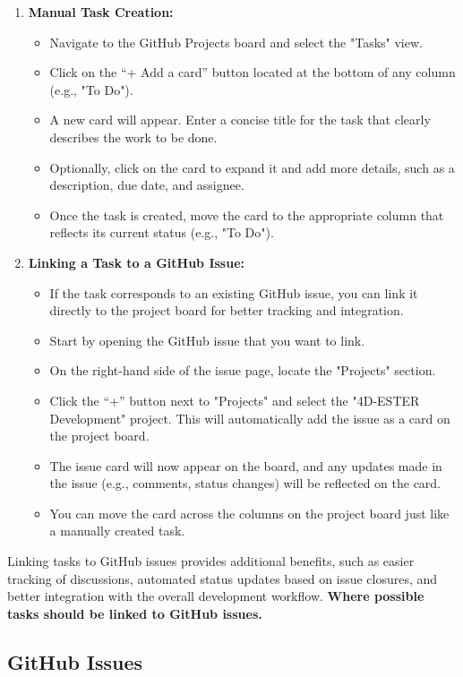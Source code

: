 \documentclass{ol-softwaremanual}
\begin{document}
\begin{enumerate}
\item \textbf{Manual Task Creation:}
\begin{itemize}
\item Navigate to the GitHub Projects board and select the "Tasks" view.
\item Click on the “+ Add a card” button located at the bottom of any column (e.g., "To Do").
\item A new card will appear. Enter a concise title for the task that clearly describes the work to be done.
\item Optionally, click on the card to expand it and add more details, such as a description, due date, and assignee.
\item Once the task is created, move the card to the appropriate column that reflects its current status (e.g., "To Do").
\end{itemize}
\item \textbf{Linking a Task to a GitHub Issue:}
\begin{itemize}
    \item If the task corresponds to an existing GitHub issue, you can link it directly to the project board for better tracking and integration.
    \item Start by opening the GitHub issue that you want to link.
    \item On the right-hand side of the issue page, locate the "Projects" section.
    \item Click the “+” button next to "Projects" and select the "4D-ESTER Development" project. This will automatically add the issue as a card on the project board.
    \item The issue card will now appear on the board, and any updates made in the issue (e.g., comments, status changes) will be reflected on the card.
    \item You can move the card across the columns on the project board just like a manually created task.
\end{itemize}

\end{enumerate}

Linking tasks to GitHub issues provides additional benefits, such as easier
tracking of discussions, automated status updates based on issue closures, and
better integration with the overall development workflow. \textbf{Where possible
tasks should be linked to GitHub issues.}

\subsection{GitHub Issues}
\end{document}

